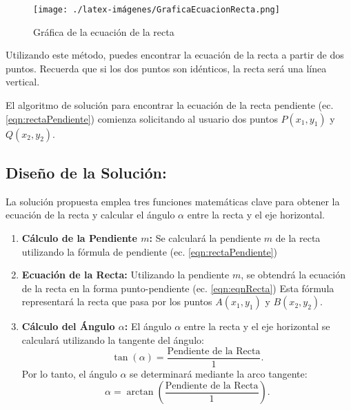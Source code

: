 \begin{figure}[h!]
    \centering
    \texttt{[image: ./latex-imágenes/GraficaEcuacionRecta.png]}
    \caption{Gráfica de la ecuación de la recta}
    \label{fig:GraficaEcuacionRecta}
\end{figure}

Utilizando este método, puedes encontrar la ecuación de la recta a partir de dos puntos. Recuerda que si los dos puntos son idénticos, la recta será una línea vertical.

El algoritmo de solución para encontrar la ecuación de la recta pendiente (ec. \ref{eqn:rectaPendiente}) comienza solicitando al usuario dos puntos \(P(x_{1}, y_{1})\) y \(Q(x_{2}, y_{2})\).

\subsection{\textbf{Diseño de la Solución:}}

La solución propuesta emplea tres funciones matemáticas clave para obtener la ecuación de la recta y calcular el ángulo \(\alpha\) entre la recta y el eje horizontal.

\begin{enumerate}
    \item \textbf{Cálculo de la Pendiente \(m\):} Se calculará la pendiente \(m\) de la recta utilizando la fórmula de pendiente
    (ec. \ref{eqn:rectaPendiente})
    
    \item \textbf{Ecuación de la Recta:} Utilizando la pendiente \(m\), se obtendrá la ecuación de la recta en la forma punto-pendiente 
    (ec. \ref{eqn:eqnRecta})
    Esta fórmula representará la recta que pasa por los puntos \(A(x_{1}, y_{1})\) y \(B(x_{2}, y_{2})\).
    
    \item \textbf{Cálculo del Ángulo \(\alpha\):} El ángulo \(\alpha\) entre la recta y el eje horizontal se calculará utilizando la tangente del ángulo:
    \begin{equation}
        \tan(\alpha) = \frac{\text{Pendiente de la Recta}}{1}.
    \end{equation}
    Por lo tanto, el ángulo \(\alpha\) se determinará mediante la arco tangente:
    \begin{equation}
        \alpha = \arctan\left(\frac{\text{Pendiente de la Recta}}{1}\right).
    \end{equation}
\end{enumerate}

